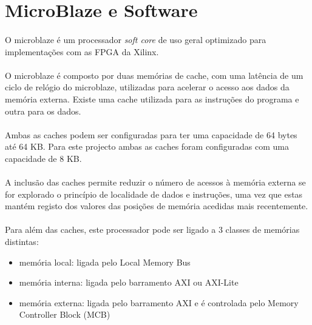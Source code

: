 \section{MicroBlaze e Software}


\paragraph{} O microblaze é um processador \textit{soft core} de uso geral optimizado para implementações com as FPGA da Xilinx.

\paragraph{} O microblaze é composto por duas memórias de cache, com uma latência de um ciclo de relógio do microblaze,  utilizadas para acelerar o acesso aos dados da memória externa. Existe uma cache utilizada para as instruções do programa e outra para os dados.

\paragraph{} Ambas as caches podem ser configuradas para ter uma capacidade de 64 bytes até 64 KB. Para este projecto ambas as caches foram configuradas com uma capacidade de 8 KB.

\paragraph{} A inclusão das caches permite reduzir o número de acessos à memória externa se for explorado o princípio de localidade de dados e instruções, uma vez que estas mantém registo dos valores das posições de memória acedidas mais recentemente.

\paragraph{} Para além das caches, este processador pode ser ligado a 3 classes de memórias distintas:
\begin{itemize}
\item memória local: ligada pelo Local Memory Bus
\item memória interna: ligada pelo barramento AXI ou
AXI-Lite
\item memória externa: ligada pelo barramento AXI e é controlada pelo Memory Controller Block (MCB)
\end{itemize}

